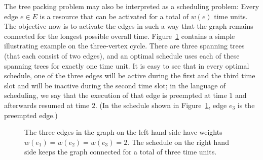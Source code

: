 \documentclass[runningheads]{llncs}
\begin{document}
The tree packing problem may also be interpreted as a scheduling problem:
Every edge $e\in E$ is a resource that can be activated for a total of $w(e)$ time units.
The objective now is to activate the edges in such a way that the graph remains connected 
for the longest possible overall time. 
Figure~\ref{fig:example} contains a simple illustrating example on the three-vertex cycle.
There are three spanning trees (that each consist of two edges), and an optimal schedule 
uses each of these spanning trees for exactly one time unit.
It is easy to see that in every optimal schedule, one of the three edges will be active 
during the first and the third time slot and will be inactive during the second time slot;
in the language of scheduling, we say that the execution of that edge is preempted 
at time $1$ and afterwards resumed at time $2$.
(In the schedule shown in Figure~\ref{fig:example}, edge $e_3$ is the preempted edge.)

\begin{figure}[tbh]
\begin{center}
\qquad\qquad
\end{center}
\caption{The three edges in the graph on the left hand side have weights $w(e_1)=w(e_2)=w(e_3)=2$.
The schedule on the right hand side keeps the graph connected for a total of three time units.}
\label{fig:example}

\vspace{-0.8cm}
\end{figure}
\end{document}
